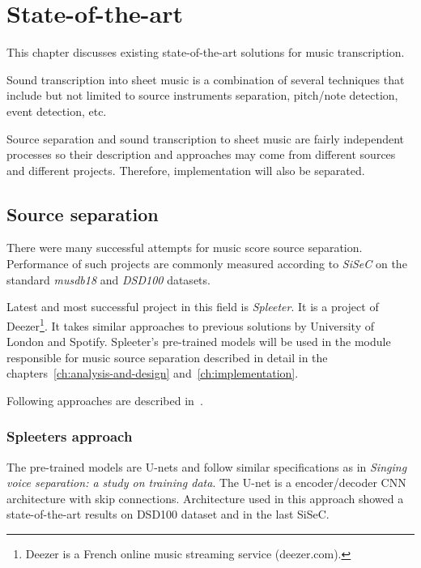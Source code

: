 \chapter{State-of-the-art}\label{ch:state-of-the-art}

This chapter discusses existing state-of-the-art solutions for music transcription.

Sound transcription into sheet music is a combination of several techniques that include but not limited to source
instruments separation, pitch/note detection, event detection, etc.

Source separation and sound transcription to sheet music are fairly independent processes so their description and
approaches may come from different sources and different projects. Therefore, implementation will also be separated.

\section{Source separation}\label{sec:source-separation}

There were many successful attempts for music score source separation\cite{spleeter2019,singing-voice-separation,singing-voice-separation-article}.
Performance of such projects are commonly measured according to \textit{\ac{SiSeC}}\cite{stter20182018}
on the standard \textit{musdb18}\cite{musdb18} and \textit{DSD100}\cite{SiSEC16} datasets.

Latest and most successful project in this field is \textit{Spleeter}\cite{spleeter2019}. It is a project of
Deezer\footnote{Deezer is a French online music streaming service (deezer.com).}. It takes similar approaches to previous solutions
by University of London and Spotify\cite{singing-voice-separation}. Spleeter's pre-trained models will be used in the
module responsible for music source separation described in detail in the chapters~\ref{ch:analysis-and-design} and~\ref{ch:implementation}.

Following approaches are described in~\cite{spleeter2019,singing-voice-separation,singing-voice-separation-article}.

\subsection{Spleeters approach}\label{subsec:music-source-separation:approach}
The pre-trained models are U-nets\cite{singing-voice-separation} and follow similar specifications as in
\textit{Singing voice separation: a study on training data}\cite{singing-voice-separation-article}. The U-net is a
encoder/decoder \ac{CNN} architecture with skip connections\cite{spleeter2019}. Architecture used in this approach
showed a state-of-the-art results on DSD100 dataset\cite{singing-voice-separation} and in the last \ac{SiSeC}\cite{SiSEC16}.

